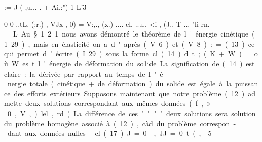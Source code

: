 := J ( ,u.,. . 
+ Ai,:")
1 L'3 

0
0 
..tL. (:r.) , VJx-, 0) = V:,., (x.)
.... 
cl. 
..u.. <i , (J.. T
... "li rn.~ \si= .L 
Au § 1.2.1 nous avons démontré le théorème de l'énergie cinétique 
(1.29), mais en élasticité on a d'après (V.6) et (V.8) 

:=
(13) 
ce qui permet d'écrire (I.29) sous la forme 
cl..
(14 ) 
d.t;(K+W) = 

où W es t l' énergie de déformation du so1ide 

La signification de (14) est claire: la dérivée par rapport au temps de l'é­nergie totale (cinétique + de déformation) du solide est égale à la puissance 
des efforts extérieurs. 
Supposons maintenant que notre problème (12) admette deux solutions correspondant aux mêmes données (f. ,».-0, V~,)..lel., rd.). La différence de ces 
.... .... "" "" .... 
deux solutions 

sera solution du problème homogène associé à (12), càd du problème correspon­dant aux données nulles 

-cl
(17) J = 0  
, JJ... =0
..t(,... 
... 
5~ 


